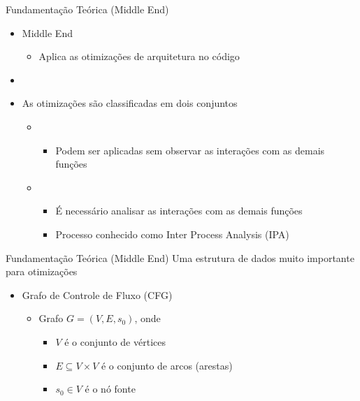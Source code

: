 \begin{frame}{Fundamentação Teórica (Middle End)}
  \begin{itemize}
    \item Middle End
    \begin{itemize}
        \item Aplica as otimizações {\color{blue}{independentes}} de arquitetura no código
    \end{itemize}
    \item[]
    \item As otimizações são classificadas em dois conjuntos {\color{red}{disjuntos}}
        \begin{itemize}
            \item {\color{blue}{Intra Procedural}}
                \begin{itemize}
                    \item Podem ser aplicadas sem observar as interações com as demais funções
                \end{itemize}
            \item {\color{red}{Inter Procedural}}
                \begin{itemize}
                    \item É necessário analisar as interações com as demais funções
                    \item Processo conhecido como Inter Process Analysis (IPA)
                \end{itemize}
        \end{itemize}
  \end{itemize}
\end{frame}

\begin{frame}{Fundamentação Teórica (Middle End)}
  Uma estrutura de dados muito importante para otimizações
  \begin{itemize}
      \item Grafo de Controle de Fluxo (CFG)
    \begin{itemize}
        \item Grafo $G = (V, E, s_0)$, onde
            \begin{itemize}
                \item $V$ é o conjunto de vértices
                \item $E \subseteq V \times V$ é o conjunto de arcos (arestas)
                \item $s_0 \in V$ é o nó fonte
            \end{itemize}
    \end{itemize}
  \end{itemize}
\end{frame}

